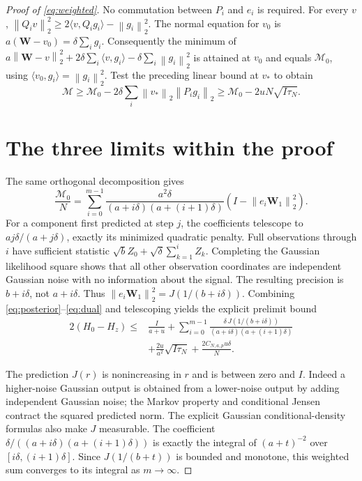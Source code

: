 \documentclass[11pt]{article}
\theoremstyle{remark}\newtheorem{remark}[theorem]{Remark}
\newcommand{\norm}[1]{\left\lVert #1\right\rVert}
\begin{document}
\begin{proof}[Proof of \eqref{eq:weighted}]
No commutation between $P_i$ and $e_i$ is required.
For every $v$,
$\norm{Q_i v}_2^2\ge2\langle v,Q_i g_i\rangle-\norm{g_i}_2^2$.
The normal equation for $v_0$ is
$a(\mathbf W-v_0)=\delta\sum_i g_i$.
Consequently the minimum of
$a\norm{\mathbf W-v}_2^2+2\delta\sum_i\langle v,g_i\rangle
-\delta\sum_i\norm{g_i}_2^2$ is attained at $v_0$ and equals $\mathcal M_0$,
using $\langle v_0,g_i\rangle=\norm{g_i}_2^2$.
Test the preceding linear bound at $v_*$ to obtain
\begin{equation}\label{eq:dual}
\mathcal M\ge\mathcal M_0-
2\delta\sum_i\norm{v_*}_2\norm{P_i g_i}_2
\ge\mathcal M_0-2uN\sqrt{I\tau_N}.
\end{equation}

\section*{The three limits within the proof}
The same orthogonal decomposition gives
\[
\frac{\mathcal M_0}{N}
=\sum_{i=0}^{m-1}
\frac{a^2\delta}{(a+i\delta)(a+(i+1)\delta)}
\left(I-\norm{e_i\mathbf W_1}_2^2\right).
\]
For a component first predicted at step $j$, the coefficients telescope to
$aj\delta/(a+j\delta)$, exactly its minimized quadratic penalty.
Full observations through $i$ have sufficient statistic
$\sqrt b Z_0+\sqrt\delta\sum_{k=1}^i Z_k$.
Completing the Gaussian likelihood square shows that all other observation
coordinates are independent Gaussian noise with no information about the
signal. The resulting precision is $b+i\delta$, not $a+i\delta$.
Thus $\norm{e_i\mathbf W_1}_2^2=J(1/(b+i\delta))$.
Combining \eqref{eq:posterior}--\eqref{eq:dual} and telescoping yields the
explicit prelimit bound
\begin{align}
2(H_0-H_z)\le {}&
\frac I{a+u}
+\sum_{i=0}^{m-1}
\frac{\delta\,J(1/(b+i\delta))}
{(a+i\delta)(a+(i+1)\delta)}
\label{eq:prelimit}\\
&+\frac{2u}{a^2}\sqrt{I\tau_N}
+\frac{2C_{N,a,p}u\delta}{N}. \nonumber
\end{align}

The prediction $J(r)$ is nonincreasing in $r$ and is between zero and $I$.
Indeed a higher-noise Gaussian output is obtained from a lower-noise
output by adding independent Gaussian noise; the Markov property and
conditional Jensen contract the squared predicted norm.
The explicit Gaussian conditional-density formulas also make $J$ measurable.
The coefficient $\delta/((a+i\delta)(a+(i+1)\delta))$ is exactly the integral
of $(a+t)^{-2}$ over $[i\delta,(i+1)\delta]$.
Since $J(1/(b+t))$ is bounded and monotone, this weighted sum converges
to its integral as $m\to\infty$.


\end{proof}
\end{document}
